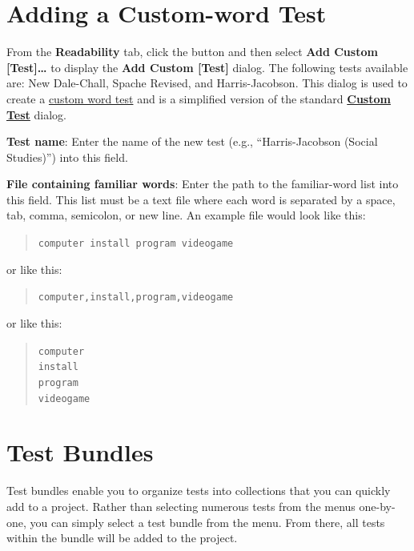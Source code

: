 \documentclass[
]{book}
\theoremstyle{definition}
\theoremstyle{definition}
\theoremstyle{definition}
\theoremstyle{definition}
\theoremstyle{remark}
\begin{document}
\hypertarget{add-custom-word-test}{%
\section{Adding a Custom-word Test}\label{add-custom-word-test}}

From the \textbf{Readability} tab, click the  button and then select \textbf{Add Custom {[}Test{]}\ldots{}} to display the \textbf{Add Custom {[}Test{]}} dialog. The following tests available are: New Dale-Chall, Spache Revised, and Harris-Jacobson. This dialog is used to create a \protect\hyperlink{creating-custom-test}{custom word test} and is a simplified version of the standard \protect\hyperlink{creating-custom-test}{\textbf{Custom Test}} dialog.

\textbf{Test name}: Enter the name of the new test (e.g., ``Harris-Jacobson (Social Studies)'') into this field.

\textbf{File containing familiar words}: Enter the path to the familiar-word list into this field. This list must be a text file where each word is separated by a space, tab, comma, semicolon, or new line. An example file would look like this:

\begin{quote}
\texttt{computer\ install\ program\ videogame}
\end{quote}

or like this:

\begin{quote}
\texttt{computer,install,program,videogame}
\end{quote}

or like this:

\begin{quote}
\texttt{computer}~\\
\texttt{install}~\\
\texttt{program}~\\
\texttt{videogame}
\end{quote}

\hypertarget{test-bundles}{%
\section{Test Bundles}\label{test-bundles}}

Test bundles enable you to organize tests into collections that you can quickly add to a project. Rather than selecting numerous tests from the menus one-by-one, you can simply select a test bundle from the menu. From there, all tests within the bundle will be added to the project.
\end{document}
